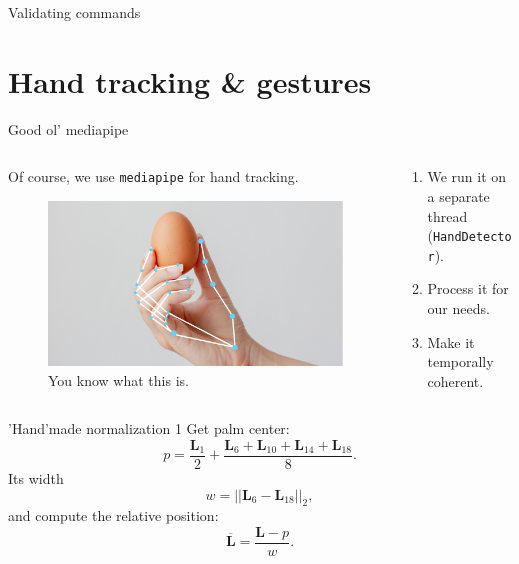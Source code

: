 \documentclass[english]{beamer}
\begin{document}
\begin{frame}{Validating commands}
\end{frame}


\section{Hand tracking \& gestures}
\begin{frame}{Good ol' mediapipe}
    \begin{columns}
        \begin{column}{.5\textwidth}
            Of course, we use \texttt{mediapipe} for hand tracking.
            \begin{figure}
                \centering
                \includegraphics[width=.9\textwidth]{images/hand_landmark.png}
                \caption{You know what this is.}
            \end{figure}
        \end{column}
        \begin{column}{.5\textwidth}
            \begin{enumerate}
                \item We run it on a separate thread (\texttt{HandDetector}).
                \item Process it for our needs.
                \item Make it temporally coherent.
            \end{enumerate}
        \end{column}
    \end{columns}
\end{frame}

\begin{frame}{'Hand'made normalization 1}
    Get palm center:
    \begin{equation}
        p = \frac{\mathbf{L}_1}{2} + \frac{\mathbf{L}_6 + \mathbf{L}_{10} + \mathbf{L}_{14} + \mathbf{L}_{18}}{8}.
    \end{equation}
    Its width
    \begin{equation}
        w = ||\mathbf{L}_6 - \mathbf{L}_{18}||_2,
    \end{equation}
    and compute the relative position:
    \begin{equation}
        \overline{\mathbf{L}} = \frac{\mathbf{L} - p}{w}.
    \end{equation}
\end{frame}
\end{document}
